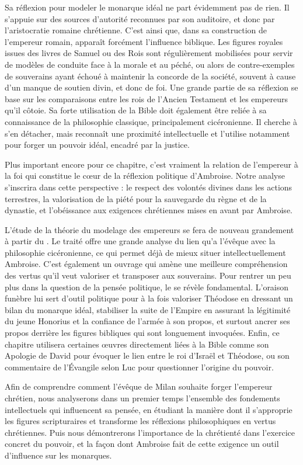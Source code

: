 Sa réflexion pour modeler le monarque idéal ne part évidemment pas de rien. Il s'appuie sur des sources d'autorité reconnues par son auditoire, et donc par l'aristocratie romaine chrétienne. C'est ainsi que, dans sa construction de l'empereur romain, apparaît forcément l'influence biblique. Les figures royales issues des livres de Samuel ou des Rois sont régulièrement mobilisées pour servir de modèles de conduite face à la morale et au péché, ou alors de contre-exemples de souverains ayant échoué à maintenir la concorde de la société, souvent à cause d'un manque de soutien divin, et donc de foi. Une grande partie de sa réflexion se base sur les comparaisons entre les rois de l'Ancien Testament et les empereurs qu'il côtoie. Sa forte utilisation de la Bible doit également être reliée à sa connaissance de la philosophie classique, principalement cicéronienne. Il cherche à s'en détacher, mais reconnaît une proximité intellectuelle et l'utilise notamment pour forger un pouvoir idéal, encadré par la justice.

\bigskip

Plus important encore pour ce chapitre, c'est vraiment la relation de l'empereur à la foi qui constitue le cœur de la réflexion politique d'Ambroise. Notre analyse s'inscrira dans cette perspective : le respect des volontés divines dans les actions terrestres, la valorisation de la piété pour la sauvegarde du règne et de la dynastie, et l'obéissance aux exigences chrétiennes mises en avant par Ambroise.

\bigskip

L'étude de la théorie du modelage des empereurs se fera de nouveau grandement à partir du . Le traité offre une grande analyse du lien qu’a l’évêque avec la philosophie cicéronienne, ce qui permet déjà de mieux situer intellectuellement Ambroise. C'est également un ouvrage qui amène une meilleure compréhension des vertus qu’il veut valoriser et transposer aux souverains. Pour rentrer un peu plus dans la question de la pensée politique, le  se révèle fondamental. L'oraison funèbre lui sert d'outil politique pour à la fois valoriser Théodose en dressant un bilan du monarque idéal, stabiliser la suite de l'Empire en assurant la légitimité du jeune Honorius et la confiance de l'armée à son propos, et surtout ancrer ses propos derrière les figures bibliques qui sont longuement invoquées. Enfin, ce chapitre utilisera certaines œuvres directement liées à la Bible comme son Apologie de David pour évoquer le lien entre le roi d'Israël et Théodose, ou son commentaire de l'Évangile selon Luc pour questionner l'origine du pouvoir.

\bigskip

Afin de comprendre comment l'évêque de Milan souhaite forger l'empereur chrétien, nous analyserons dans un premier temps l'ensemble des fondements intellectuels qui influencent sa pensée, en étudiant la manière dont il s'approprie les figures scripturaires et transforme les réflexions philosophiques en vertus chrétiennes. Puis nous démontrerons l'importance de la chrétienté dans l'exercice concret du pouvoir, et la façon dont Ambroise fait de cette exigence un outil d'influence sur les monarques.
